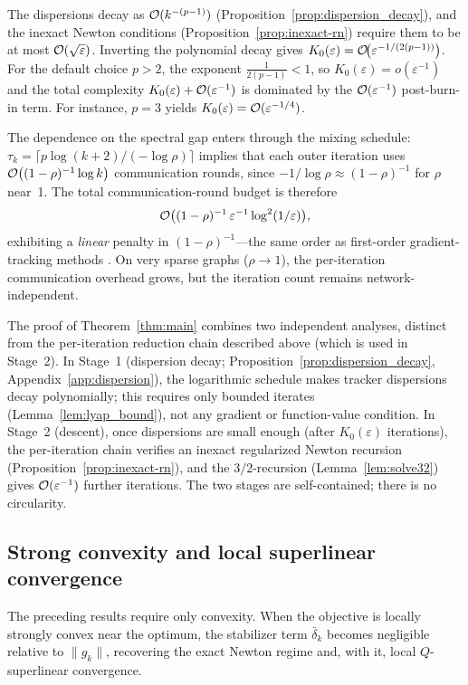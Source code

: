\documentclass[review,onefignum,onetabnum]{siamart171218}
\begin{document}
\begin{remark}\label{rem:burnin_order}
The dispersions decay as $\mathcal{O}(k^{-(p-1)})$
(Proposition~\ref{prop:dispersion_decay}), and the inexact Newton
conditions (Proposition~\ref{prop:inexact-rn}) require them to be at
most $\mathcal{O}(\sqrt\varepsilon)$.
Inverting the polynomial decay gives
$K_0(\varepsilon)=\mathcal{O}\!\bigl(\varepsilon^{-1/(2(p-1))}\bigr)$.
For the default choice $p>2$, the exponent $\frac{1}{2(p-1)}<1$, so
$K_0(\varepsilon)=o(\varepsilon^{-1})$ and the total complexity
$K_0(\varepsilon)+\mathcal{O}(\varepsilon^{-1})$ is dominated by the
$\mathcal{O}(\varepsilon^{-1})$ post-burn-in term.
For instance, $p=3$ yields
$K_0(\varepsilon)=\mathcal{O}(\varepsilon^{-1/4})$.

The dependence on the spectral gap enters through the mixing schedule:
$\tau_k=\lceil p\log(k+2)/(-\log\rho)\rceil$ implies that each
outer iteration uses $\mathcal{O}\bigl((1-\rho)^{-1}\log k\bigr)$
communication rounds, since $-1/\log\rho\approx(1-\rho)^{-1}$ for
$\rho$ near~1.
The total communication-round budget is therefore
\[
\mathcal{O}\bigl((1-\rho)^{-1}\,\varepsilon^{-1}\log^2(1/\varepsilon)\bigr),
\]
exhibiting a \emph{linear} penalty in $(1-\rho)^{-1}$---the same
order as first-order gradient-tracking methods
\citep{nedic2017diging}.
On very sparse graphs ($\rho\to 1$), the per-iteration communication
overhead grows, but the iteration count remains network-independent.
\end{remark}

\begin{remark}\label{rem:two_stages}
The proof of Theorem~\ref{thm:main} combines two independent
analyses, distinct from the per-iteration reduction chain described above
(which is used in Stage~2).
In Stage~1 (dispersion decay;
Proposition~\ref{prop:dispersion_decay},
Appendix~\ref{app:dispersion}), the logarithmic schedule
makes tracker dispersions decay polynomially; this requires only
bounded iterates (Lemma~\ref{lem:lyap_bound}), not any gradient
or function-value condition.
In Stage~2 (descent), once dispersions are small enough
(after $K_0(\varepsilon)$ iterations), the per-iteration chain
verifies an inexact regularized Newton recursion
(Proposition~\ref{prop:inexact-rn}), and the $3/2$-recursion
(Lemma~\ref{lem:solve32}) gives $\mathcal{O}(\varepsilon^{-1})$ further
iterations.
The two stages are self-contained; there is no circularity.
\end{remark}

\subsection{Strong convexity and local superlinear convergence}\label{ssec:superlinear}
The preceding results require only convexity.
When the objective is locally strongly convex near the optimum,
the stabilizer term $\bar\delta_k$ becomes negligible relative to
$\|g_k\|$, recovering the exact Newton regime and, with it, local
$Q$-superlinear convergence.
\end{document}
